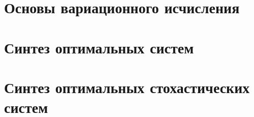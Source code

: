 \documentclass[preprint,russian,a5paper,10pt,twoside]{ncc}
\begin{document}

\clearpage
\section{Основы вариационного исчисления\label{variations}}

\clearpage
\section{Синтез оптимальных систем\label{synthesis}}

\clearpage
\section{Синтез оптимальных стохастических систем\label{stochastic}}
\end{document}
